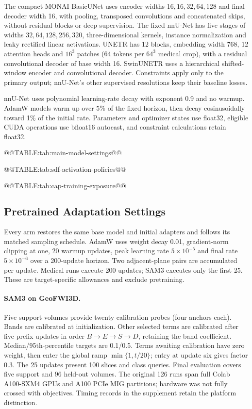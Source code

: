 The compact MONAI BasicUNet uses encoder widths $16,16,32,64,128$
and final decoder width 16, with pooling, transposed convolutions and
concatenated skips, without residual blocks or deep supervision.
The fixed nnU-Net has five stages of widths $32,64,128,256,320$,
three-dimensional kernels, instance normalization and leaky rectified
linear activations. UNETR has 12 blocks, embedding width 768, 12
attention heads and $16^3$ patches (64 tokens per $64^3$ medical crop),
with a residual convolutional decoder of base width 16. SwinUNETR
uses a hierarchical shifted-window encoder and convolutional decoder.
Constraints apply only to the primary output; nnU-Net's other supervised
resolutions keep their baseline losses.

nnU-Net uses polynomial learning-rate decay with exponent 0.9 and no
warmup. AdamW models warm up over 5\% of the fixed horizon, then decay
cosinusoidally toward 1\% of the initial rate. Parameters and optimizer
states use float32, eligible CUDA operations use bfloat16 autocast,
and constraint calculations retain float32.

@@TABLE:tab:main-model-settings@@

@@TABLE:tab:sdf-activation-policies@@

@@TABLE:tab:cap-training-exposure@@

\subsection{Pretrained Adaptation Settings}
\label{sec:adaptation-implementation}

Every arm restores the same base model and initial adapters and follows
its matched sampling schedule. AdamW uses weight decay 0.01,
gradient-norm clipping at one, 20 warmup updates, peak learning rate
$5\times10^{-5}$ and final rate $5\times10^{-6}$ over a 200-update
horizon. Two adjacent-plane pairs are accumulated per update.
Medical runs execute 200 updates; SAM3 executes only the first 25.
These are target-specific allowances and exclude pretraining.

\paragraph{SAM3 on GeoFWI3D.}\label{sec:sam3-methods-details}
Five support volumes provide twenty calibration probes (four anchors
each). Bands are calibrated at initialization. Other selected terms
are calibrated after five prefix updates in order $B\to E\to S\to D$,
retaining the band coefficient. Median/95th-percentile targets are
0.1/0.5. Terms awaiting calibration have zero weight, then enter the
global ramp $\min\{1,t/20\}$; entry at update six gives factor 0.3.
The 25 updates present 100 slices and class queries. Final evaluation
covers five support and 96 held-out volumes. The original 126 runs
span full Colab A100-SXM4 GPUs and A100 PCIe MIG partitions;
hardware was not fully crossed with objectives. Timing records in the
supplement retain the platform distinction.

